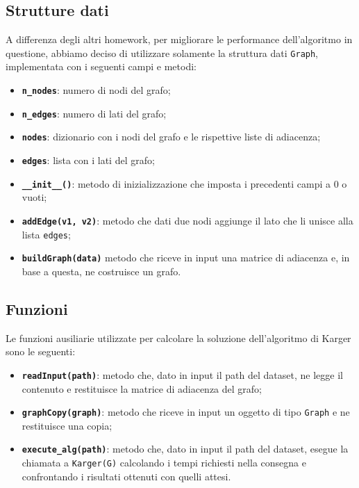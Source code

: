 \subsection{Strutture dati}

	A differenza degli altri homework, per migliorare le performance dell'algoritmo in questione, abbiamo deciso di utilizzare solamente la struttura dati \texttt{Graph}, implementata con i seguenti campi e metodi:
	\begin{itemize}
		\item \texttt{\textbf{n\_nodes}}: numero di nodi del grafo;
		\item \texttt{\textbf{n\_edges}}: numero di lati del grafo;
		\item \texttt{\textbf{nodes}}: dizionario con i nodi del grafo e le rispettive liste di adiacenza;
		\item \texttt{\textbf{edges}}: lista con i lati del grafo;
		\item \texttt{\textbf{\_\_init\_\_()}}: metodo di inizializzazione che imposta i precedenti campi a 0 o vuoti;
		\item \texttt{\textbf{addEdge(v1, v2)}}: metodo che dati due nodi aggiunge il lato che li unisce alla lista \texttt{edges};
		\item \texttt{\textbf{buildGraph(data)}} metodo che riceve in input una matrice di adiacenza e, in base a questa, ne costruisce un grafo.
	\end{itemize}
	
\subsection{Funzioni}
	
	Le funzioni ausiliarie utilizzate per calcolare la soluzione dell'algoritmo di Karger sono le seguenti:
	\begin{itemize}
		\item \texttt{\textbf{readInput(path)}}: metodo che, dato in input il path del dataset, ne legge il contenuto e restituisce la matrice di adiacenza del grafo;
		\item \texttt{\textbf{graphCopy(graph)}}: metodo che riceve in input un oggetto di tipo \texttt{Graph} e ne restituisce una copia;
		\item \texttt{\textbf{execute\_alg(path)}}: metodo che, dato in input il path del dataset, esegue la chiamata a \texttt{Karger(G)} calcolando i tempi richiesti nella consegna e confrontando i risultati ottenuti con quelli attesi.
	\end{itemize}

